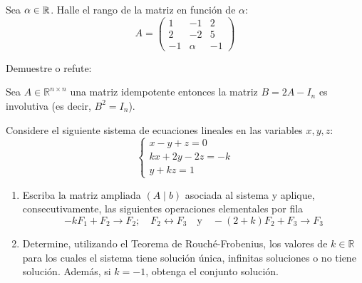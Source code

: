 \documentclass[10pt,a4]{examenEPN0}
\begin{document}
\encabezado
{}
\indicacionesPrueba
\begin{preguntas}

\item Sea $\alpha\in\mathbb{R}$. Halle el rango de la matriz en función de $\alpha$:
\[
A = \begin{pmatrix} 
1 & -1 & 2 \\ 
2 & -2 & 5 \\ 
-1 & \alpha & -1 
\end{pmatrix} 
\]
\par\vfill\newpage




\item Demuestre o refute:

  Sea $A \in \mathbb{R}^{n \times n}$  una matriz idempotente entonces la matriz $B = 2A - I_n$ es involutiva (es decir, $B^2 = I_n$).
\par\vfill\newpage







\item Considere el siguiente sistema de ecuaciones lineales en las variables $x, y, z$: 
\[
\begin{cases} 
x - y + z = 0 \\ 
kx + 2y  -2z = -k \\ 
 y + kz = 1 
\end{cases}
\]

\begin{enumerate}
 \item  Escriba la matriz ampliada $(A \mid b)$ asociada al sistema y aplique, consecutivamente, las siguientes operaciones elementales por fila   \[-kF_1 + F_2\rightarrow F_2;\quad F_2\leftrightarrow F_3 \quad  \text{y} \quad  -(2+k)F_2 + F_3 \rightarrow F_3\]


\item  Determine, utilizando el Teorema de Rouché-Frobenius, los valores de $k\in \mathbb{R}$ para los cuales el sistema tiene solución única, infinitas soluciones o no tiene solución. Además, si $k=-1$, obtenga el conjunto solución.  
\end{enumerate}
\par\vfill\newpage



\end{preguntas}
\end{document}
